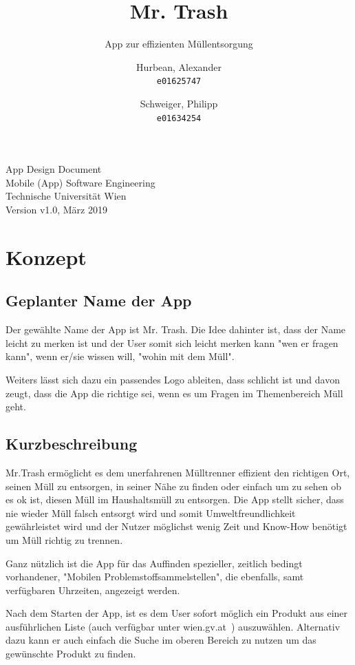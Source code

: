 \documentclass[12pt, a4paper]{scrreprt}
\title{Mr. Trash}
\subtitle{App zur effizienten Müllentsorgung}
\author{
    Hurbean, Alexander\\
    \texttt{e01625747}
    \and
    Schweiger, Philipp\\
    \texttt{e01634254}}
\begin{document}
\maketitle

\null\vfill
\noindent
App Design Document\\ 
Mobile (App) Software Engineering\\
Technische Universität Wien\\
Version v1.0, März 2019
\newpage

\tableofcontents

\chapter{Konzept}

\section{Geplanter Name der App}
Der gewählte Name der App ist Mr. Trash. Die Idee dahinter ist, dass der Name leicht zu merken ist und der User somit sich leicht merken kann "wen er fragen kann", wenn er/sie wissen will, "wohin mit dem Müll".

Weiters lässt sich dazu ein passendes Logo ableiten, dass schlicht ist und davon zeugt, dass die App die richtige sei, wenn es um Fragen im Themenbereich Müll geht.

\section{Kurzbeschreibung}
Mr.Trash ermöglicht es dem unerfahrenen Mülltrenner effizient den richtigen Ort, seinen Müll zu entsorgen, in seiner Nähe zu finden oder einfach um zu sehen ob es ok ist, diesen Müll im Haushaltsmüll zu entsorgen. Die App stellt sicher, dass nie wieder Müll falsch entsorgt wird und somit Umweltfreundlichkeit gewährleistet wird und der Nutzer möglichst wenig Zeit und Know-How benötigt um Müll richtig zu trennen.

Ganz nützlich ist die App für das Auffinden spezieller, zeitlich bedingt vorhandener, "Mobilen Problemstoffsammelstellen", die ebenfalls, samt verfügbaren Uhrzeiten, angezeigt werden.

Nach dem Starten der App, ist es dem User sofort möglich ein Produkt aus einer ausführlichen Liste (auch verfügbar unter wien.gv.at~\cite{muelltrennabc}) auszuwählen. Alternativ dazu kann er auch einfach die Suche im oberen Bereich zu nutzen um das gewünschte Produkt zu finden.
\end{document}
